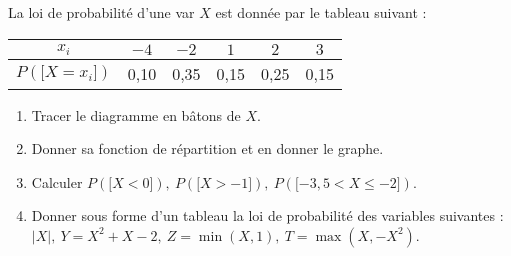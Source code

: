 \documentclass[a4paper, 11pt,reqno]{article}
\begin{document}
\begin{exercice}  \;
	La loi de probabilit\'e d'une var $X$ est donn\'ee par le tableau
	suivant :\\\begin{center} \begin{tabular}{|c|c|c|c|c|c|} \hline $x_i$     & $-4$ & $-2$ & $1$  & $2$  & $3$  \\
               \hline $P(\lbrack X=x_i\rbrack)$ & 0,10 & 0,35 & 0,15 & 0,25 & 0,15
               \\ \hline
		\end{tabular} \end{center}
	\begin{enumerate}
		\item Tracer le diagramme en b\^atons de $X$.
		\item Donner sa fonction de r\'epartition et en donner le graphe.
		\item Calculer $P(\lbrack X<0\rbrack),\ P(\lbrack X>-1\rbrack ),\ P(\lbrack -3,5<X\leq -2\rbrack)$.
		\item Donner sous forme d'un tableau la loi de probabilit\'e des
		      variables suivantes : $|X|,\ Y=X^2+X-2,\ Z=\min(X,1),\
			      T=\max(X,-X^2)$.
	\end{enumerate}
\end{exercice}
\end{document}
